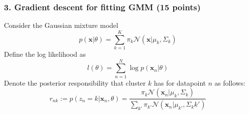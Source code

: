 \documentclass[12pt]{article}%
\begin{document}
\newpage


\subsubsection*{3. Gradient descent for fitting GMM (15 points)}
Consider the Gaussian mixture model
\[p(\mathbf{x}|\theta)=\sum_{k=1}^{K} \pi_{k} \mathcal{N}(\mathbf{x}|\mu_k,\Sigma_k)\]
Define the log likelihood as
\[ l(\theta) = \sum_{n=1}^N \log p(\mathbf{x}_n|\theta)
\]
Denote the posterior responsibility that cluster $k$ has for datapoint $n$ as follows:
\[
r_{nk}:=p(z_n=k|\mathbf{x}_n,\theta) = \frac{\pi_k\mathcal{N}(\mathbf{x}_n|\mu_k,\Sigma_k)}{\sum_{k'}\pi_{k'}\mathcal{N}(\mathbf{x}_n|\mu_{k'},\Sigma_k{k'})}
\]
\end{document}
